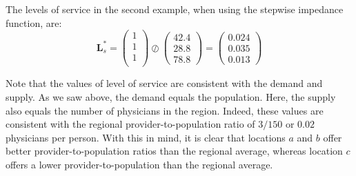 \documentclass[10pt,letterpaper]{article}
\begin{document}
The levels of service in the second example, when using the stepwise
impedance function, are: \[
\mathbf{L}^*_s = \left( \begin{array}{c}
1 \\
1 \\
1 \\
\end{array}\right)\oslash
\left( \begin{array}{c}
42.4\\
28.8\\
78.8
\end{array} \right)=
\left( \begin{array}{c}
0.024\\
0.035\\
0.013
\end{array} \right)
\]

Note that the values of level of service are consistent with the demand
and supply. As we saw above, the demand equals the population. Here, the
supply also equals the number of physicians in the region. Indeed, these
values are consistent with the regional provider-to-population ratio of
\(3/150\) or \(0.02\) physicians per person. With this in mind, it is
clear that locations \(a\) and \(b\) offer better provider-to-population
ratios than the regional average, whereas location \(c\) offers a lower
provider-to-population than the regional average.
\end{document}
